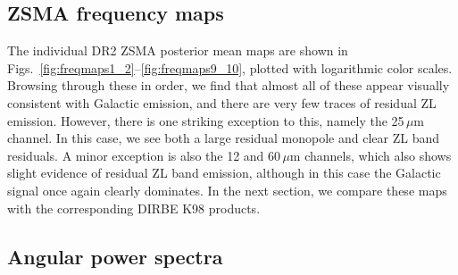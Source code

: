 \documentclass{aa}
\begin{document}
\subsection{ZSMA frequency maps}

The individual DR2 ZSMA posterior mean maps are shown in
Figs.~\ref{fig:freqmaps1_2}--\ref{fig:freqmaps9_10}, plotted with
logarithmic color scales. Browsing through these in order, we find
that almost all of these appear visually consistent with Galactic
emission, and there are very few traces of residual ZL
emission. However, there is one striking exception to this, namely the
25$\,\mu$m channel. In this case, we see both a large residual
monopole and clear ZL band residuals. A minor exception is also the
12 and 60$\,\mu$m channels, which also shows slight evidence of residual ZL
band emission, although in this case the Galactic signal once again
clearly dominates. In the next section, we compare these maps with the
corresponding DIRBE K98 products.


\subsection{Angular power spectra}
\end{document}
